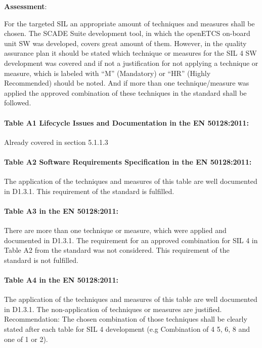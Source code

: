 \textbf{Assessment}:

\bigskip

For the targeted SIL an appropriate amount of techniques and measures shall be chosen. The SCADE Suite development tool, in which the openETCS on-board unit SW was developed, covers great amount of them. However, in the quality assurance plan it should be stated which technique or measures for the SIL 4 SW development was covered and if not a justification for not applying a technique or measure, which is labeled with “M” (Mandatory) or “HR” (Highly Recommended) should be noted. And if more than one technique/measure was applied the approved combination of these techniques in the standard shall be followed.

\bigskip

\paragraph{Table A1 Lifecycle Issues and Documentation in the EN 50128:2011:}
Already covered in section 5.1.1.3

\paragraph{Table A2 Software Requirements Specification in the EN 50128:2011:}
 
The application of the techniques and measures of this table are well documented in D1.3.1.
This requirement of the standard is fulfilled.

\paragraph{Table A3 in the EN 50128:2011: }

There are more than one technique or measure, which were applied and documented in D1.3.1. The requirement for an approved combination for SIL 4 in Table A2 from the standard was not considered.
This requirement of the standard is not fulfilled.


\paragraph{Table A4 in the EN 50128:2011:}
 
The application of the techniques and measures of this table are well documented in D1.3.1. The non-application of techniques or measures are justified.
Recommendation: The chosen combination of those techniques shall be clearly stated after each table for SIL 4 development (e.g Combination of 4 5, 6, 8 and one of 1 or 2).

